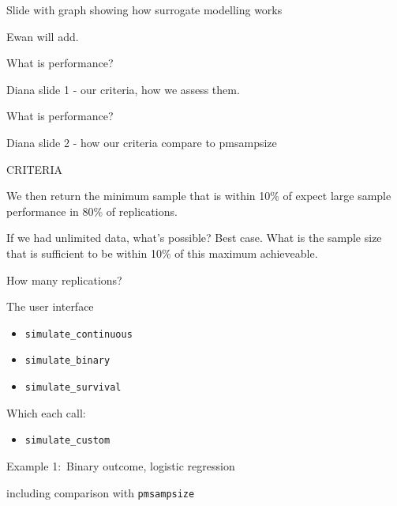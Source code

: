 \documentclass[11pt]{beamer}
\begin{document}
\begin{frame}[t]{Slide with graph showing how surrogate modelling works}

    Ewan will add.

\end{frame}

\begin{frame}[t]{What is performance?}

    Diana slide 1 - our criteria, how we assess them.

\end{frame}

\begin{frame}[t]{What is performance?}

    Diana slide 2 - how our criteria compare to pmsampsize 

\end{frame}

\begin{frame}[t]{CRITERIA}

	We then return the minimum sample that is within 10\% of expect large
	sample performance in 80\% of replications.

	If we had unlimited data, what's possible? Best case. What is the sample
	size that is sufficient to be within 10\% of this maximum achieveable.

	How many replications?

\end{frame}

\begin{frame}[t]{The user interface}

	\begin{itemize}
		\item \texttt{simulate\_continuous}
		\item \texttt{simulate\_binary}
		\item \texttt{simulate\_survival}
	\end{itemize}

	Which each call:

	\begin{itemize}
		\item \texttt{simulate\_custom}
	\end{itemize}

\end{frame}

\begin{frame}[t]{Example 1:\ Binary outcome, logistic regression }

	including comparison with \texttt{pmsampsize}

\end{frame}
\end{document}
